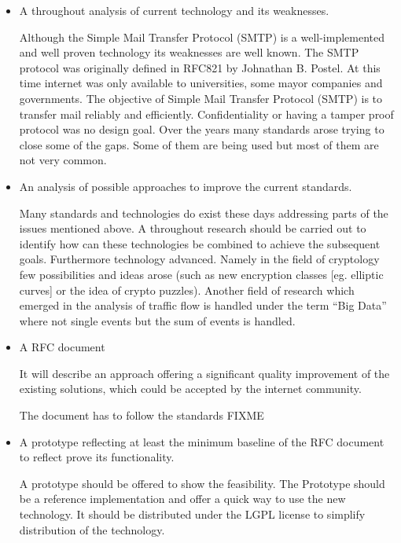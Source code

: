 \begin{itemize}
  \item A throughout analysis of current technology and its weaknesses.\par
	      Although the Simple Mail Transfer Protocol (SMTP) is a well-implement\-ed and well proven technology its weaknesses are well known. The SMTP protocol was originally defined in RFC821\cite{RFC821} by Johnathan B. Postel. At this time internet was only available to universities, some mayor companies and governments. The objective of Simple Mail Transfer Protocol (SMTP) is to transfer mail reliably and efficiently\cite[p.~1]{RFC821}. Confidentiality or having a tamper proof protocol was no design goal. Over the years many standards arose trying to close some of the gaps. Some of them are being used but most of them are not very common. 
	\item An analysis of possible approaches to improve the current standards.\par
	      Many standards and technologies do exist these days addressing parts of the issues mentioned above. A throughout research should be carried out to identify how can these technologies be combined to achieve the subsequent goals. Furthermore technology advanced. Namely in the field of cryptology few possibilities and ideas arose (such as new encryption classes [eg. elliptic curves] or the idea of crypto puzzles). Another field of research which emerged in the analysis of traffic flow is handled under the term ``Big Data'' where not single events but the sum of events is handled.
	\item A RFC document\par
	      It will describe an approach offering a significant quality improvement of the existing solutions, which could be accepted by the internet community.\par
	      The document has to follow the standards FIXME
	\item A prototype reflecting at least the minimum baseline of the RFC document to reflect prove its functionality.\par
	      A prototype should be offered to show the feasibility. The Prototype should be a reference implementation and offer a quick way to use the new technology. It should be distributed under the LGPL license to simplify distribution of the technology. 
\end{itemize}


